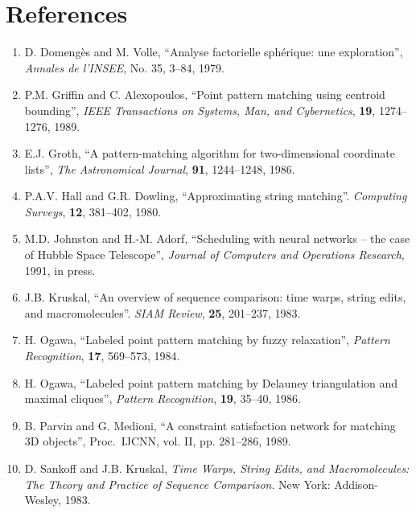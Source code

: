 \section*{References}

\begin{enumerate}

\item D. Domeng\`es and M. Volle, ``Analyse factorielle sph\'erique: une
exploration'', {\it Annales de l'INSEE}, No. 35, 3--84, 1979.

\item P.M. Griffin and C. Alexopoulos, ``Point pattern matching using
centroid bounding'', {\it IEEE Transactions on Systems, Man, and Cybernetics},
{\bf 19}, 1274--1276, 1989.

\item E.J. Groth, ``A pattern-matching algorithm for two-dimensional
coordinate lists'', {\it The Astronomical Journal}, {\bf 91}, 1244--1248,
1986.

\item P.A.V. Hall and G.R. Dowling, 
``Approximating string matching''.
{\it Computing Surveys}, {\bf 12}, 381--402, 1980.

\item M.D. Johnston and H.-M. Adorf, ``Scheduling with neural networks --
the case of Hubble Space Telescope'', {\it Journal of Computers and
Operations Research}, 1991, in press.

\item J.B. Kruskal, 
``An overview of sequence comparison: time warps, string
edits, and macromolecules''. {\it SIAM Review}, {\bf 25}, 201--237, 1983.


\item H. Ogawa, ``Labeled point pattern matching by fuzzy relaxation'', 
{\it Pattern Recognition}, {\bf 17}, 569--573, 1984.

\item H. Ogawa, ``Labeled point pattern matching by Delauney triangulation
and maximal cliques'', {\it Pattern Recognition}, {\bf 19}, 35--40, 1986.

\item B. Parvin and G. Medioni, ``A constraint satisfaction network for
matching 3D objects'', Proc.\ IJCNN, vol. II, pp. 281--286, 1989.

\item D. Sankoff  and J.B. Kruskal, 
{\it Time Warps, String Edits, and
Macromolecules: The Theory and Practice of Sequence Comparison}.
New York: Addison-Wesley, 1983.


\end{enumerate}
